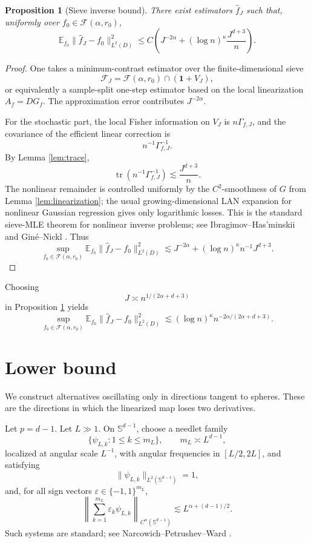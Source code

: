 \documentclass[11pt]{article}
\newtheorem{proposition}{Proposition}
\newcommand{\bbone}{\mathbf 1}
\newcommand{\E}{\mathbb E}
\newcommand{\cF}{\mathcal F}
\begin{document}
\begin{proposition}[Sieve inverse bound]
\label{prop:upper}
There exist estimators \(\widehat f_J\) such that, uniformly over \(f_0\in\cF(\alpha,r_0)\),
\[
 \E_{f_0}\|\widehat f_J-f_0\|_{L^2(D)}^2
 \le
 C\left(
 J^{-2\alpha}
 +
 (\log n)^\kappa \frac{J^{d+3}}{n}
 \right).
\]
\end{proposition}

\begin{proof}
One takes a minimum-contrast estimator over the finite-dimensional sieve
\[
 \cF_J=\cF(\alpha,r_0)\cap(\bbone+V_J),
\]
or equivalently a sample-split one-step estimator based on the local linearization \(A_f=DG_f\). The approximation error contributes \(J^{-2\alpha}\).

For the stochastic part, the local Fisher information on \(V_J\) is \(n\Gamma_{f,J}\), and the covariance of the efficient linear correction is
\[
 n^{-1}\Gamma_{f,J}^{-1}.
\]
By Lemma \ref{lem:trace},
\[
 \operatorname{tr}(n^{-1}\Gamma_{f,J}^{-1})
 \lesssim
 \frac{J^{d+3}}{n}.
\]
The nonlinear remainder is controlled uniformly by the \(C^2\)-smoothness of \(G\) from Lemma \ref{lem:linearization}; the usual growing-dimensional LAN expansion for nonlinear Gaussian regression gives only logarithmic losses. This is the standard sieve-MLE theorem for nonlinear inverse problems; see Ibragimov--Has'minskii \cite[Ch. VII]{IH} and Giné--Nickl \cite[Ch. 7]{GN}. Thus
\[
 \sup_{f_0\in\cF(\alpha,r_0)}
 \E_{f_0}\|\widehat f_J-f_0\|_{L^2(D)}^2
 \lesssim
 J^{-2\alpha}
 +
 (\log n)^\kappa n^{-1}J^{d+3}.
\]
\end{proof}

Choosing
\[
 J\asymp n^{1/(2\alpha+d+3)}
\]
in Proposition \ref{prop:upper} yields
\[
 \sup_{f_0\in\cF(\alpha,r_0)}
 \E_{f_0}\|\widehat f_J-f_0\|_{L^2(D)}^2
 \lesssim
 (\log n)^\kappa n^{-2\alpha/(2\alpha+d+3)}.
\]

\section{Lower bound}

We construct alternatives oscillating only in directions tangent to spheres. These are the directions in which the linearized map loses two derivatives.

Let \(p=d-1\). Let \(L\gg1\). On \(\mathbb S^{d-1}\), choose a needlet family
\[
 \{\psi_{L,k}:1\le k\le m_L\},
 \qquad m_L\asymp L^{d-1},
\]
localized at angular scale \(L^{-1}\), with angular frequencies in \([L/2,2L]\), and satisfying
\[
 \|\psi_{L,k}\|_{L^2(\mathbb S^{d-1})}=1,
\]
and, for all sign vectors \(\varepsilon\in\{-1,1\}^{m_L}\),
\[
 \left\|
 \sum_{k=1}^{m_L}\varepsilon_k\psi_{L,k}
 \right\|_{C^\alpha(\mathbb S^{d-1})}
 \lesssim
 L^{\alpha+(d-1)/2}.
\]
Such systems are standard; see Narcowich--Petrushev--Ward \cite{NPW}.
\end{document}
